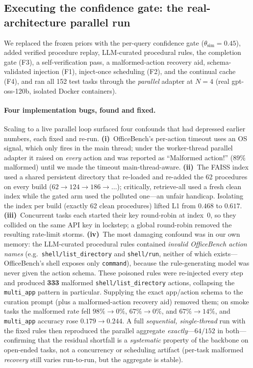 \documentclass[10pt,twocolumn]{article}
\newcommand{\code}[1]{\texttt{\small #1}}
\begin{document}
\subsection{Executing the confidence gate: the real-architecture parallel run}\label{sec:confgate}
We replaced the frozen priors with the per-query confidence gate ($\theta_{\text{sim}}{=}0.45$),
added verified procedure replay, LLM-curated procedural rules, the completion gate (F3), a
self-verification pass, a malformed-action recovery aid, schema-validated injection (F1), inject-once
scheduling (F2), and the continual cache (F4), and ran all 152 test tasks through the
\emph{parallel} adapter at $N{=}4$ (real gpt-oss-120b, isolated Docker containers).

\paragraph{Four implementation bugs, found and fixed.} Scaling to a live parallel loop surfaced
four confounds that had depressed earlier numbers, each fixed and re-run. \textbf{(i)}~OfficeBench's
per-action timeout uses an OS signal, which only fires in the main thread; under the worker-thread
parallel adapter it raised on \emph{every} action and was reported as ``Malformed action!''
($89\%$ malformed) until we made the timeout main-thread-aware. \textbf{(ii)}~The FAISS index used a
shared persistent directory that re-loaded and re-added the 62 procedures on every build
($62{\to}124{\to}186{\to}\ldots$); critically, retrieve-all used a fresh clean index while the gated
arm used the polluted one---an unfair handicap. Isolating the index per build (exactly 62 clean
procedures) lifted L1 from $0.468$ to $0.617$. \textbf{(iii)}~Concurrent tasks each started their
key round-robin at index~0, so they collided on the same API key in lockstep; a global round-robin
removed the resulting rate-limit storms. \textbf{(iv)}~The most damaging confound was in our own
memory: the LLM-curated procedural rules contained \emph{invalid OfficeBench action names}
(e.g.\ \code{shell/list\_directory} and \code{shell/run}, neither of which exists---OfficeBench's
shell exposes only \code{command}), because the rule-generating model was never given the
action schema. These poisoned rules were re-injected every step and produced \textbf{333}
malformed \code{shell/list\_directory} actions, collapsing the \code{multi\_app} pattern in
particular. Supplying the exact app/action schema to the curation prompt (plus a malformed-action
recovery aid) removed them; on smoke tasks the malformed rate fell $98\%{\to}0\%$, $67\%{\to}0\%$,
and $67\%{\to}14\%$, and \code{multi\_app} accuracy rose $0.179{\to}0.244$. A full
\emph{sequential, single-thread} run with the fixed rules then reproduced the parallel
aggregate \emph{exactly}---$64/152$ in both---confirming that the residual shortfall is a
\emph{systematic} property of the backbone on open-ended tasks, not a concurrency or scheduling
artifact (per-task malformed \emph{recovery} still varies run-to-run, but the aggregate is stable).
\end{document}
